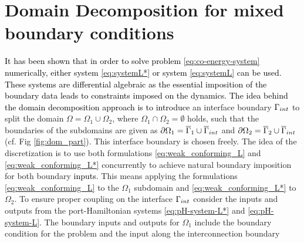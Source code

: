 \documentclass[11pt,a4paper]{article}
\newcommand{\revone}[1]{{\textcolor{black}{#1}}}
\begin{document}
\section{Domain Decomposition for mixed boundary conditions}\label{sec:domain_decomposition}
\revone{It has been shown that in order to solve problem \eqref{eq:co-energy-system} numerically, either system \eqref{eq:systemL*} or system \eqref{eq:systemL} can be used. These systems are differential algebraic as the essential imposition of the boundary data leads to constraints imposed on the dynamics. The idea behind the domain decomposition approach is to introduce} an interface boundary $\Gamma_{\rm int}$ to split the domain $\Omega=\Omega_1\cup\Omega_2$, where $\Omega_1\cap\Omega_2=\emptyset$ holds, such that the boundaries of the subdomains are given as $\partial\Omega_1=\overline{\Gamma}_1\cup\overline{\Gamma}_{\rm int}$ and $\partial\Omega_2=\overline{\Gamma}_2\cup\overline{\Gamma}_{\rm int}$ (cf. Fig \ref{fig:dom_part}). This interface boundary is chosen freely. The idea of the discretization is to use both formulations \eqref{eq:weak_conforming_L} and \eqref{eq:weak_conforming_L*} concurrently to achieve natural boundary imposition for both boundary \revone{inputs}. This means applying the formulations \eqref{eq:weak_conforming_L} to the $\Omega_1$ subdomain and \eqref{eq:weak_conforming_L*} to $\Omega_2$. To ensure proper coupling on the interface $\Gamma_{\rm int}$ consider the inputs and outputs from the port-Hamiltonian systems \eqref{eq:pH-system-L*} and \eqref{eq:pH-system-L}. The boundary inputs and outputs for $\Omega_1$ include the boundary condition for the problem and the input along the interconnection boundary 
\end{document}
